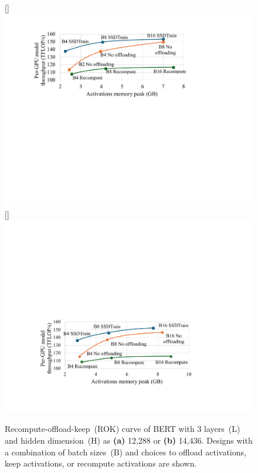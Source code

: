 \begin{figure}[!htbp]
\centering
{}
[\linewidth]{\includegraphics[scale=0.7]{figures/SSDTrain/eval_dse_a_v2.pdf}}
[\linewidth]{\includegraphics[scale=0.7]{figures/SSDTrain/eval_dse_b_v2.pdf}}
\caption{\label{fig:eval_dse}Recompute-offload-keep~(ROK) curve of BERT with 3 layers~(L) and hidden dimension~(H) as \textbf{(a)} 12,288 or \textbf{(b)} 14,436. Designs with a combination of  batch sizes~(B) and choices to offload activations, keep activations, or recompute activations are shown. }
\end{figure}




